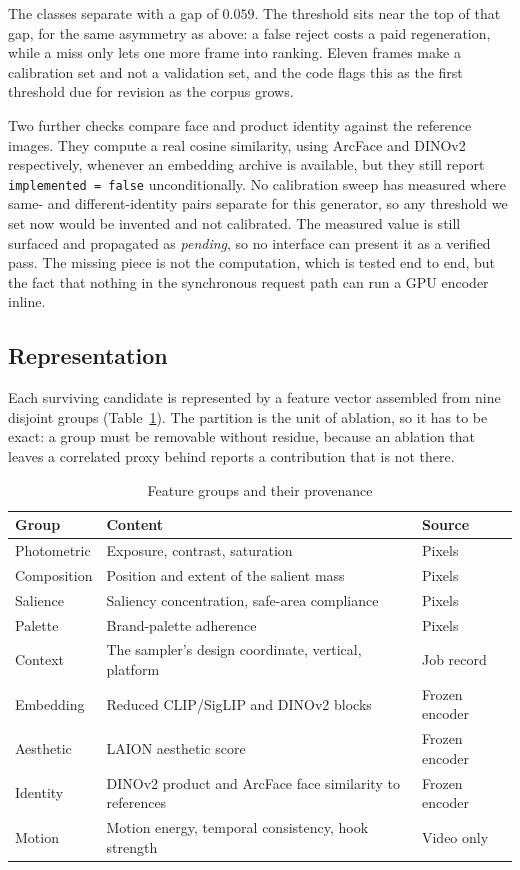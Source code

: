 \documentclass[conference]{IEEEtran}
\begin{document}
\noindent The classes separate with a gap of $0.059$. The threshold sits near the
top of that gap, for the same asymmetry as above: a false reject costs a paid
regeneration, while a miss only lets one more frame into ranking. Eleven frames make
a calibration set and not a validation set, and the code flags this as the first
threshold due for revision as the corpus grows.

Two further checks compare face and product identity against the reference images.
They compute a real cosine similarity, using ArcFace and DINOv2 respectively,
whenever an embedding archive is available, but they still report
\texttt{implemented = false} unconditionally. No calibration sweep has measured
where same- and different-identity pairs separate for this generator, so any
threshold we set now would be invented and not calibrated. The measured value is
still surfaced and propagated as \emph{pending}, so no interface can present it as a
verified pass. The missing piece is not the computation, which is tested end to end,
but the fact that nothing in the synchronous request path can run a GPU encoder
inline.

\subsection{Representation}
\label{sec:features}

Each surviving candidate is represented by a feature vector assembled from nine
disjoint groups (Table~\ref{tab:groups}). The partition is the unit of ablation, so
it has to be exact: a group must be removable without residue, because an ablation
that leaves a correlated proxy behind reports a contribution that is not there.

\begin{table}[t]
\caption{Feature groups and their provenance}
\label{tab:groups}
\centering
\tiny
\begin{tabular}{@{}p{1.6cm}p{4.1cm}p{1.5cm}@{}}
\toprule
\textbf{Group} & \textbf{Content} & \textbf{Source} \\
\midrule
Photometric & Exposure, contrast, saturation & Pixels \\
Composition & Position and extent of the salient mass & Pixels \\
Salience & Saliency concentration, safe-area compliance & Pixels \\
Palette & Brand-palette adherence & Pixels \\
Context & The sampler's design coordinate, vertical, platform & Job record \\
Embedding & Reduced CLIP/SigLIP and DINOv2 blocks & Frozen encoder \\
Aesthetic & LAION aesthetic score & Frozen encoder \\
Identity & DINOv2 product and ArcFace face similarity to references & Frozen encoder \\
Motion & Motion energy, temporal consistency, hook strength & Video only \\
\bottomrule
\end{tabular}
\end{table}
\end{document}
